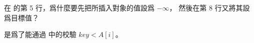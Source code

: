 \startEXERCISE
在  的第 5 行，爲什麼要先把所插入對象的值設爲 $-\infty$，
然後在第 8 行又將其設爲目標值？
\stopEXERCISE

\startANSWER
是爲了能通過  中的校驗 $key < A[i]$。
\stopANSWER
